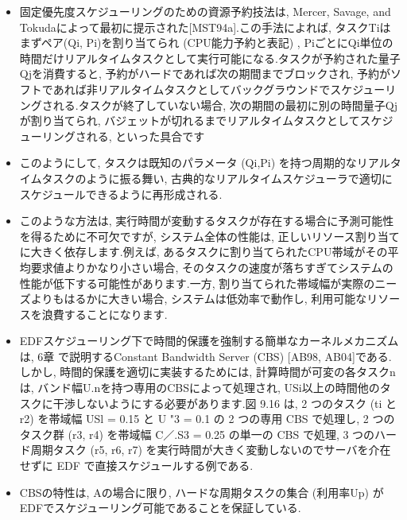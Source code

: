 \begin{frame}{}
\begin{itemize}
\item 固定優先度スケジューリングのための資源予約技法は, Mercer, Savage, and Tokudaによって最初に提示された[MST94a].この手法によれば, タスクTiはまずペア(Qi, Pi)を割り当てられ (CPU能力予約と表記) , PiごとにQi単位の時間だけリアルタイムタスクとして実行可能になる.タスクが予約された量子Qjを消費すると, 予約がハードであれば次の期間までブロックされ, 予約がソフトであれば非リアルタイムタスクとしてバックグラウンドでスケジューリングされる.タスクが終了していない場合, 次の期間の最初に別の時間量子Qjが割り当てられ, バジェットが切れるまでリアルタイムタスクとしてスケジューリングされる, といった具合です
\end{itemize}
\end{frame}

\begin{frame}{}
\begin{itemize}
\item このようにして, タスクは既知のパラメータ (Qi,Pi) を持つ周期的なリアルタイムタスクのように振る舞い, 古典的なリアルタイムスケジューラで適切にスケジュールできるように再形成される.
\end{itemize}
\end{frame}

\begin{frame}{}
\begin{itemize}
\item このような方法は, 実行時間が変動するタスクが存在する場合に予測可能性を得るために不可欠ですが, システム全体の性能は, 正しいリソース割り当てに大きく依存します.例えば, あるタスクに割り当てられたCPU帯域がその平均要求値よりかなり小さい場合, そのタスクの速度が落ちすぎてシステムの性能が低下する可能性があります.一方, 割り当てられた帯域幅が実際のニーズよりもはるかに大きい場合, システムは低効率で動作し, 利用可能なリソースを浪費することになります.
\end{itemize}
\end{frame}

\begin{frame}{}
\begin{itemize}
\item EDFスケジューリング下で時間的保護を強制する簡単なカーネルメカニズムは, 6章 で説明するConstant Bandwidth Server (CBS) [AB98, AB04]である.しかし, 時間的保護を適切に実装するためには, 計算時間が可変の各タスクnは, バンド幅U.nを持つ専用のCBSによって処理され, USi以上の時間他のタスクに干渉しないようにする必要があります.図 9.16 は, 2 つのタスク (ti と r2) を帯域幅 USl = 0.15 と U "3 = 0.1 の 2 つの専用 CBS で処理し, 2 つのタスク群 (r3, r4) を帯域幅 C／.S3 = 0.25 の単一の CBS で処理, 3 つのハード周期タスク (r5, r6, r7) を実行時間が大きく変動しないのでサーバを介在せずに EDF で直接スケジュールする例である.
\end{itemize}
\end{frame}

\begin{frame}{}
\end{frame}

\begin{frame}{}
\begin{itemize}
\item CBSの特性は, Aの場合に限り, ハードな周期タスクの集合 (利用率Up) がEDFでスケジューリング可能であることを保証している.
\end{itemize}
\end{frame}
